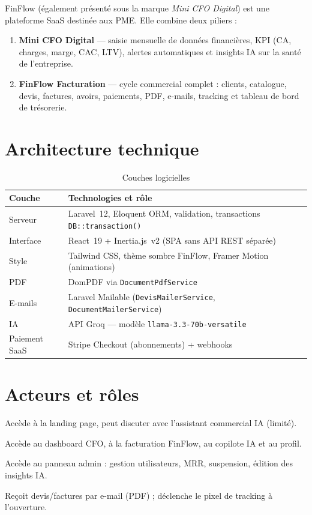 \documentclass[11pt,a4paper]{report}
\newcommand{\svc}[1]{\texttt{\small #1}}
\newcommand{\feat}[1]{\textbf{#1}}
\begin{document}
FinFlow (également présenté sous la marque \emph{Mini CFO Digital}) est une plateforme SaaS destinée aux PME. Elle combine deux piliers :

\begin{enumerate}[leftmargin=*]
    \item \feat{Mini CFO Digital} — saisie mensuelle de données financières, KPI (CA, charges, marge, CAC, LTV), alertes automatiques et insights IA sur la santé de l'entreprise.
    \item \feat{FinFlow Facturation} — cycle commercial complet : clients, catalogue, devis, factures, avoirs, paiements, PDF, e-mails, tracking et tableau de bord de trésorerie.
\end{enumerate}

\section{Architecture technique}

\begin{table}[h]
\centering
\caption{Couches logicielles}
\begin{tabular}{@{}ll@{}}
\toprule
\textbf{Couche} & \textbf{Technologies et rôle} \\
\midrule
Serveur & Laravel~12, Eloquent ORM, validation, transactions \texttt{DB::transaction()} \\
Interface & React~19 + Inertia.js~v2 (SPA sans API REST séparée) \\
Style & Tailwind CSS, thème sombre FinFlow, Framer Motion (animations) \\
PDF & DomPDF via \svc{DocumentPdfService} \\
E-mails & Laravel Mailable (\svc{DevisMailerService}, \svc{DocumentMailerService}) \\
IA & API Groq — modèle \texttt{llama-3.3-70b-versatile} \\
Paiement SaaS & Stripe Checkout (abonnements) + webhooks \\
\bottomrule
\end{tabular}
\end{table}

\section{Acteurs et rôles}

\begin{description}[leftmargin=3cm, style=nextline]
    \item[Visiteur] Accède à la landing page, peut discuter avec l'assistant commercial IA (limité).
    \item[Utilisateur abonné] Accède au dashboard CFO, à la facturation FinFlow, au copilote IA et au profil.
    \item[Administrateur] Accède au panneau admin : gestion utilisateurs, MRR, suspension, édition des insights IA.
    \item[Client externe] Reçoit devis/factures par e-mail (PDF) ; déclenche le pixel de tracking à l'ouverture.
\end{description}
\end{document}
